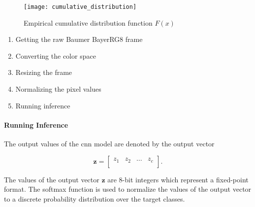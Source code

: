 \begin{figure}
  \centering
  \texttt{[image: cumulative\_distribution]}
  \caption{Empirical cumulative distribution function $F(x)$}
  \label{fig:cumulative_distribution}
\end{figure}






\begin{enumerate}
  \item Getting the raw Baumer BayerRG8 frame
  \item Converting the color space
  \item Resizing the frame
  \item Normalizing the pixel values
  \item Running inference
\end{enumerate}


\paragraph{Running Inference}

The output values of the \acrshort{cnn} model are denoted by the output vector

\begin{equation}
  \boldsymbol{z} =
  \begin{bmatrix}
    z_1 & z_2 & \dots & z_c \\
  \end{bmatrix}.
  \label{eq:output_vector}
\end{equation}

The values of the output vector $\boldsymbol{z}$ are 8-bit integers which represent a fixed-point format.
The softmax function is used to normalize the values of the output vector to a discrete probability distribution over the target classes.

